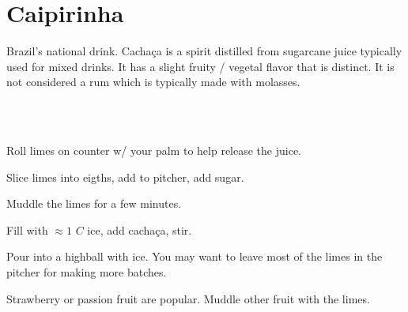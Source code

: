 \section[Caipirinha]{Caipirinha}


\begin{recipestats}[
	servings=2,
	preptime=5 \minute,
	source=Kevin \& Marina,
]
\end{recipestats}


\begin{recipeabstract}
	Brazil's national drink.
	Cacha\c{c}a is a spirit distilled from sugarcane juice typically used for mixed drinks.
	It has a slight fruity / vegetal flavor that is distinct.
	It is not considered a rum which is typically made with molasses.
\end{recipeabstract}


\begin{ingredientcolumns}[1]
	\begin{ingredientblock}
		\\
		\\
	\end{ingredientblock}
\end{ingredientcolumns}


\begin{preparation}
\item Roll limes on counter w/ your palm to help release the juice.

\item Slice limes into eigths, add to pitcher, add sugar.

\item Muddle the limes for a few minutes.

\item Fill with $\approx 1$ $C$ ice, add cacha\c{c}a, stir.

\item Pour into a highball with ice.
	You may want to leave most of the limes in the pitcher for making more batches.
\end{preparation}


\begin{variation}
\item Strawberry or passion fruit are popular.
	Muddle other fruit with the limes.
\end{variation}


\recipeend
